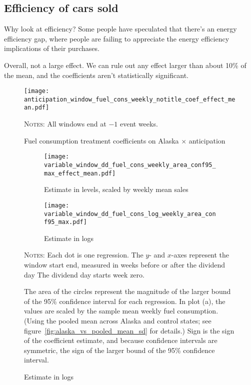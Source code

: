 \documentclass[11pt,letterpaper,oneside]{article}
\newcommand{\gpm}{\textsc{gpm}}
\begin{document}
\begin{doublespacing}
\subsection{Efficiency of cars sold}

Why look at efficiency?
Some people have speculated that there's an energy efficiency gap, where people are failing to appreciate the energy efficiency implications of their purchases.

Overall, not a large effect. We can rule out any effect larger than about 10\% of the mean, and the coefficients aren't statistically significant.


\begin{figure}[hbt]
    \caption{Fuel consumption treatment coefficients on Alaska $\times$ anticipation}
    \texttt{[image: anticipation\_window\_fuel\_cons\_weekly\_notitle\_coef\_effect\_mean.pdf]}

    {\footnotesize
    \textsc{Notes:}
    All windows end at $-1$ event weeks.
    }
\end{figure}


\begin{figure}[hbt]
    \caption{Fuel consumption effects with varying windows}
    \begin{subfigure}{\linewidth}
        \caption{Estimate in levels, scaled by weekly mean sales}
        \texttt{[image: variable\_window\_dd\_fuel\_cons\_weekly\_area\_conf95\_max\_effect\_mean.pdf]}
    \end{subfigure}
    \begin{subfigure}{\linewidth}
        \caption{Estimate in logs}
        \texttt{[image: variable\_window\_dd\_fuel\_cons\_log\_weekly\_area\_conf95\_max.pdf]}
    \end{subfigure}


    {\footnotesize
    \textsc{Notes:}
    Each dot is one regression.
    The $y$- and $x$-axes represent the window start end, measured in weeks before or after the dividend day
    The dividend day starts week zero.

     The area of the circles represent the magnitude of the larger bound of the 95\% confidence interval for each regression.
    In plot (a), the values are scaled by the sample mean weekly fuel consumption.
    (Using the pooled mean across Alaska and control states; see figure~\ref{fig:alaska_vs_pooled_mean_sd} for details.)
    Sign is the sign of the coefficient estimate, and because confidence intervals are symmetric, the sign of the larger bound of the 95\% confidence interval.
    }
\end{figure}




\end{doublespacing}
\end{document}
